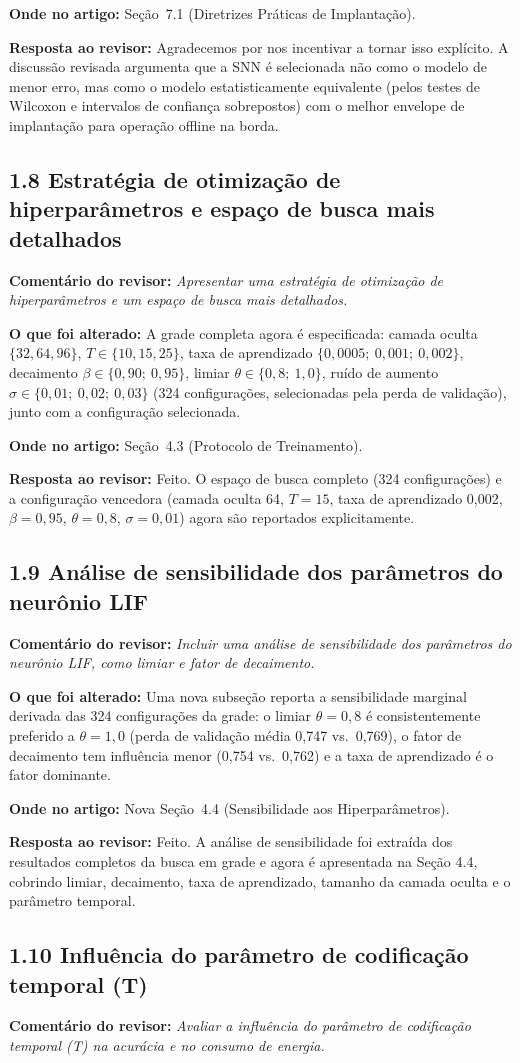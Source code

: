 \documentclass[11pt,a4paper]{article}
\newcommand{\comment}[1]{\textbf{Comentário do revisor:} \textit{#1}}
\newcommand{\change}[1]{\textbf{O que foi alterado:} #1}
\newcommand{\where}[1]{\textbf{Onde no artigo:} #1}
\newcommand{\resp}[1]{\textbf{Resposta ao revisor:} \textcolor{revblue}{#1}}
\newcommand{\pt}[1]{\subsection*{#1}}
\begin{document}
\where{Seção~7.1 (Diretrizes Práticas de Implantação).}

\resp{Agradecemos por nos incentivar a tornar isso explícito. A discussão revisada argumenta que a SNN é selecionada não como o modelo de menor erro, mas como o modelo estatisticamente equivalente (pelos testes de Wilcoxon e intervalos de confiança sobrepostos) com o melhor envelope de implantação para operação offline na borda.}

\pt{1.8 Estratégia de otimização de hiperparâmetros e espaço de busca mais detalhados}
\comment{Apresentar uma estratégia de otimização de hiperparâmetros e um espaço de busca mais detalhados.}

\change{A grade completa agora é especificada: camada oculta $\{32, 64, 96\}$, $T \in \{10, 15, 25\}$, taxa de aprendizado $\{0{,}0005;\ 0{,}001;\ 0{,}002\}$, decaimento $\beta \in \{0{,}90;\ 0{,}95\}$, limiar $\theta \in \{0{,}8;\ 1{,}0\}$, ruído de aumento $\sigma \in \{0{,}01;\ 0{,}02;\ 0{,}03\}$ (324 configurações, selecionadas pela perda de validação), junto com a configuração selecionada.}

\where{Seção~4.3 (Protocolo de Treinamento).}

\resp{Feito. O espaço de busca completo (324 configurações) e a configuração vencedora (camada oculta 64, $T=15$, taxa de aprendizado 0,002, $\beta=0{,}95$, $\theta=0{,}8$, $\sigma=0{,}01$) agora são reportados explicitamente.}

\pt{1.9 Análise de sensibilidade dos parâmetros do neurônio LIF}
\comment{Incluir uma análise de sensibilidade dos parâmetros do neurônio LIF, como limiar e fator de decaimento.}

\change{Uma nova subseção reporta a sensibilidade marginal derivada das 324 configurações da grade: o limiar $\theta=0{,}8$ é consistentemente preferido a $\theta=1{,}0$ (perda de validação média 0,747 vs.\ 0,769), o fator de decaimento tem influência menor (0,754 vs.\ 0,762) e a taxa de aprendizado é o fator dominante.}

\where{Nova Seção~4.4 (Sensibilidade aos Hiperparâmetros).}

\resp{Feito. A análise de sensibilidade foi extraída dos resultados completos da busca em grade e agora é apresentada na Seção 4.4, cobrindo limiar, decaimento, taxa de aprendizado, tamanho da camada oculta e o parâmetro temporal.}

\pt{1.10 Influência do parâmetro de codificação temporal (T)}
\comment{Avaliar a influência do parâmetro de codificação temporal (T) na acurácia e no consumo de energia.}
\end{document}
